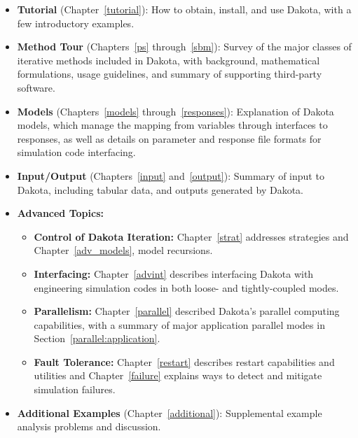 \begin{itemize}

\item {\bf Tutorial} (Chapter~\ref{tutorial}): How to obtain, install,
  and use Dakota, with a few introductory examples.

\item {\bf Method Tour} (Chapters~\ref{ps} through~\ref{sbm}): Survey
  of the major classes of iterative methods included in Dakota, with
  background, mathematical formulations, usage guidelines, and summary
  of supporting third-party software.

\item {\bf Models} (Chapters~\ref{models} through~\ref{responses}):
  Explanation of Dakota models, which manage the mapping from
  variables through interfaces to responses, as well as details on
  parameter and response file formats for simulation code interfacing.

\item {\bf Input/Output} (Chapters~\ref{input} and~\ref{output}):
  Summary of input to Dakota, including tabular data, and outputs
  generated by Dakota.

\item {\bf Advanced Topics:}
  \begin{itemize}

  \item {\bf Control of Dakota Iteration:} Chapter~\ref{strat}
    addresses strategies and Chapter~\ref{adv_models}, model
    recursions.

  \item {\bf Interfacing:} Chapter~\ref{advint} describes interfacing
    Dakota with engineering simulation codes in both loose- and
    tightly-coupled modes.

  \item {\bf Parallelism:} Chapter~\ref{parallel} described Dakota's
    parallel computing capabilities, with a summary of major
    application parallel modes in Section~\ref{parallel:application}.

  \item {\bf Fault Tolerance:} Chapter~\ref{restart} describes restart
    capabilities and utilities and Chapter~\ref{failure} explains ways
    to detect and mitigate simulation failures.

  \end{itemize}

\item {\bf Additional Examples} (Chapter~\ref{additional}):
  Supplemental example analysis problems and discussion.

\end{itemize}


